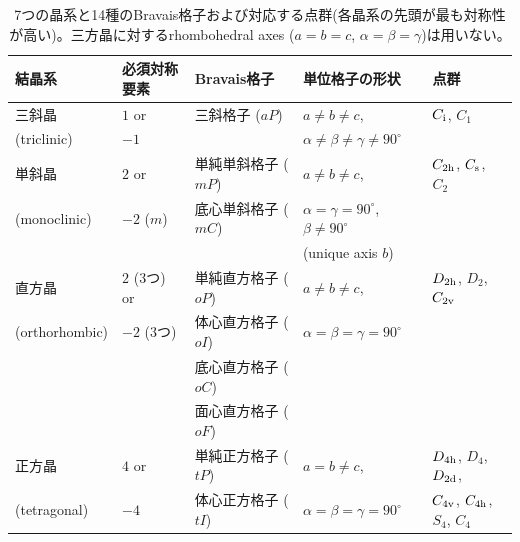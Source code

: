 \documentclass[11pt]{easymemo}
\begin{document}
\begin{table}[h!]
  \caption{7つの晶系と14種のBravais格子および対応する点群(各晶系の先頭が最も対称性が高い)。三方晶に対するrhombohedral axes ($a=b=c$, $\alpha=\beta=\gamma$)は用いない。
  \label{tbl:1}}
  \begin{tabular}{lllll} \hline\hline
    結晶系         & 必須対称要素 & Bravais格子         & 単位格子の形状                                    & 点群                                              \\ \hline
    三斜晶         & $1$ or       & 三斜格子 ($aP$)     & $a\ne b\ne c$,                                    & $C_{\rm i}$, $C_{1}$                              \\
    (triclinic)    & $-1$         &                     & $\alpha\ne\beta\ne\gamma\ne 90^{\circ}$                                                               \\ \hline
    単斜晶         & $2$ or       & 単純単斜格子 ($mP$) & $a\ne b\ne c$,                                    & $C_{\rm 2h}$, $C_{\rm s}$, $C_{2}$                \\
    (monoclinic)   & $-2$ ($m$)   & 底心単斜格子 ($mC$) & $\alpha=\gamma= 90^{\circ}$, $\beta\ne90^{\circ}$                                                     \\
                   &              &                     & (unique axis $b$)                                                                                     \\ \hline
    直方晶         & $2$ (3つ) or & 単純直方格子 ($oP$) & $a\ne b\ne c$,                                    & $D_{\rm 2h}$, $D_{2}$, $C_{\rm 2v}$               \\
    (orthorhombic) & $-2$ (3つ)   & 体心直方格子 ($oI$) & $\alpha=\beta=\gamma= 90^{\circ}$                                                                     \\
                   &              & 底心直方格子 ($oC$)                                                                                                         \\
                   &              & 面心直方格子 ($oF$)                                                                                                         \\ \hline
    正方晶         & $4$ or       & 単純正方格子 ($tP$) & $a=b\ne c$,                                       & $D_{\rm 4h}$, $D_{4}$, $D_{\rm 2d}$,              \\
    (tetragonal)   & $-4$         & 体心正方格子 ($tI$) & $\alpha=\beta=\gamma= 90^{\circ}$                 & $C_{\rm 4v}$, $C_{\rm 4h}$, $S_{4}$, $C_{4}$      \\ \hline

\end{tabular}
\end{table}
\end{document}
